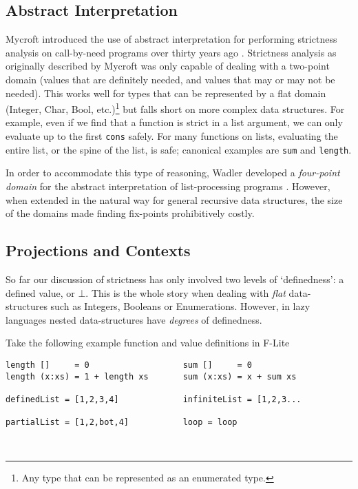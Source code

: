 \subsection{Abstract Interpretation}

Mycroft introduced the use of abstract interpretation for performing strictness
analysis on call-by-need programs over thirty years ago
\citep{mycroft1980theory}.
Strictness analysis as originally described by Mycroft was only capable of
dealing with a two-point domain (values that are definitely needed, and values
that may or may not be needed). This works well for types that can be
represented by a flat domain (Integer, Char, Bool, etc.)\footnote{Any type that
can be represented as an enumerated type.} but falls short on more complex data
structures. For example, even if we find that a function is strict in a list
argument, we can only evaluate up to the first \verb'cons' safely. For many
functions on lists, evaluating the entire list, or the spine of the list, is
safe; canonical examples are \verb'sum' and \verb'length'.

In order to accommodate this type of reasoning, Wadler developed a
\emph{four-point domain} for the abstract interpretation of list-processing
programs \citep{wadler1987strictness}. However, when extended in the natural way
for general recursive data structures, the size of the domains made finding
fix-points prohibitively costly.

\subsection{Projections and Contexts}
\label{sec:projections}

So far our discussion of strictness has only involved two levels of
`definedness': a defined value, or $\bot$. This is the whole story when dealing
with \emph{flat} data-structures such as Integers, Booleans or Enumerations.
However, in lazy languages nested data-structures have \emph{degrees} of
definedness.

Take the following example function and value definitions in F-Lite

\begin{centering}
\begin{BVerbatim}
length []     = 0                   sum []     = 0
length (x:xs) = 1 + length xs       sum (x:xs) = x + sum xs

definedList = [1,2,3,4]             infiniteList = [1,2,3...

partialList = [1,2,bot,4]           loop = loop
\end{BVerbatim}
\end{centering}\\

